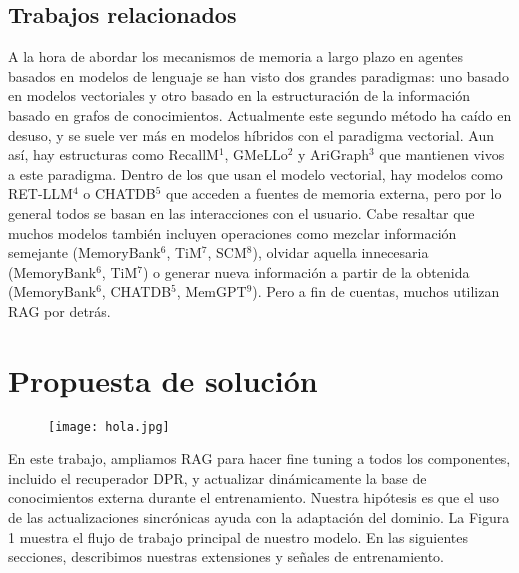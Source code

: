\documentclass{article}
\begin{document}
\subsection{Trabajos relacionados}
A la hora de abordar los mecanismos de memoria a largo plazo en agentes basados en modelos de lenguaje se han visto dos grandes paradigmas: uno basado en modelos vectoriales y otro basado en la estructuración de la información basado en grafos de conocimientos. Actualmente este segundo método ha caído en desuso, y se suele ver más en modelos híbridos con el paradigma vectorial. Aun así, hay estructuras como RecallM$^1$, GMeLLo$^2$ y AriGraph$^3$ que mantienen vivos a este paradigma.
Dentro de los que usan el modelo vectorial, hay modelos como RET-LLM$^4$ o CHATDB$^5$ que acceden a fuentes de memoria externa, pero por lo general todos se basan en las interacciones con el usuario. Cabe resaltar que muchos modelos también incluyen operaciones como mezclar información semejante (MemoryBank$^6$, TiM$^7$, SCM$^8$), olvidar aquella innecesaria (MemoryBank$^6$, TiM$^7$) o generar nueva información a partir de la obtenida (MemoryBank$^6$, CHATDB$^5$, MemGPT$^9$). Pero a fin de cuentas, muchos utilizan RAG por detrás.



\section{Propuesta de solución}



\begin{figure}[h] %
    \centering %
    \texttt{[image: hola.jpg]}
    
\end{figure}%



En este trabajo, ampliamos RAG para hacer fine tuning a todos los componentes, incluido el recuperador DPR, y actualizar dinámicamente la base de conocimientos externa durante el entrenamiento. Nuestra hipótesis es que el uso de las actualizaciones sincrónicas ayuda con la adaptación del dominio. La Figura 1 muestra el flujo de trabajo principal de nuestro modelo. En las siguientes secciones, describimos nuestras extensiones y señales de entrenamiento.
\end{document}
